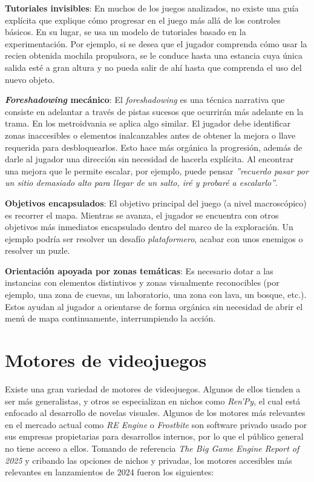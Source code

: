 \textbf{Tutoriales invisibles}: En muchos de los juegos analizados, no existe una guía explícita que explique cómo progresar en el juego más allá de los controles básicos. En su lugar, se usa un modelo de tutoriales basado en la experimentación. Por ejemplo, si se desea que el jugador comprenda cómo usar la recien obtenida mochila propulsora, se le conduce hasta una estancia cuya única salida esté a gran altura y no pueda salir de ahí hasta que comprenda el uso del nuevo objeto.


\textbf{\textit{Foreshadowing} mecánico}: El \textit{foreshadowing} es una técnica narrativa que consiste en adelantar a través de pistas sucesos que ocurrirán más adelante en la trama. En los metroidvania se aplica algo similar. El jugador debe identificar zonas inaccesibles o elementos inalcanzables antes de obtener la mejora o llave requerida para desbloquearlos. Esto hace más orgánica la progresión, además de darle al jugador una dirección sin necesidad de hacerla explícita. Al encontrar una mejora que le permite escalar, por ejemplo, puede pensar \textit{''recuerdo pasar por un sitio demasiado alto para llegar de un salto, iré y probaré a escalarlo''}.


\textbf{Objetivos encapsulados}: El objetivo principal del juego (a nivel macroscópico) es recorrer el mapa. Mientras se avanza, el jugador se encuentra con otros objetivos más inmediatos encapsulado dentro del marco de la exploración. Un ejemplo podría ser resolver un desafío \textit{plataformero}, acabar con unos enemigos o resolver un puzle. 


\textbf{Orientación apoyada por zonas temáticas}: Es necesario dotar a las instancias con elementos distintivos y zonas visualmente reconocibles (por ejemplo, una zona de cuevas, un laboratorio, una zona con lava, un bosque, etc.). Estos ayudan al jugador a orientarse de forma orgánica sin necesidad de abrir el menú de mapa continuamente, interrumpiendo la acción.

\section{Motores de videojuegos}

Existe una gran variedad de motores de videojuegos. Algunos de ellos tienden a ser más generalistas, y otros se especializan en nichos como \textit{Ren'Py}\cite{renpy}, el cual está enfocado al desarrollo de novelas visuales. Algunos de los motores más relevantes en el mercado actual como \textit{RE Engine} o \textit{Frostbite} son software privado usado por sus empresas propietarias para desarrollos internos, por lo que el público general no tiene acceso a ellos. Tomando de referencia \textit{The Big Game Engine Report of 2025}\cite{game-engine-report} y cribando las opciones de nichos y privadas, los motores accesibles más relevantes en lanzamientos de 2024 fueron los siguientes:

